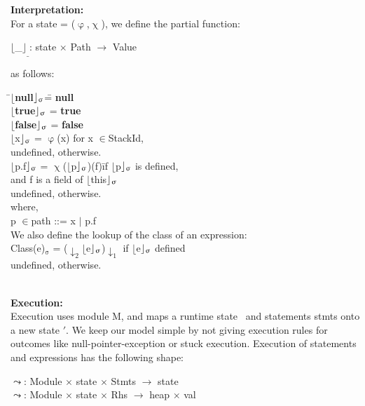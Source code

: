 \documentclass[a4paper,11pt,twoside]{article}
\newenvironment{logic}
{\begin{minipage}[c]{\linewidth}  \sffamily \mdseries \begin{tabbing}}
{\end{tabbing}\end{minipage}\vspace{0.3em}}
\newcommand{\loin}{$\in$}
\newcommand{\losigma}{\text{$\upsigma$}}
\newcommand{\lochi}{$\upchi$}
\newcommand{\lophi}{$\upvarphi$}
\newcommand{\loleadsto} {$\leadsto$}
\newcommand{\loexec}[2] {$\lfloor$#1$\rfloor _{\text{#2}}$}
\begin{document}
\textbf{Interpretation:}\\
For a state \losigma = (\lophi,\lochi), we define the partial function:\\

\begin{logic}
\quad \loexec{\_}{\_}: state $\times$ Path $\rightarrow$ Value\\
\end{logic}

as follows:\\
\begin{logic}
\quad\=\loexec{\textbf{null}}{\losigma}\quad \= = \textbf{null}\\
\>\loexec{\textbf{true}}{\losigma} \>= \textbf{true}\\
\>\loexec{\textbf{false}}{\losigma} \>= \textbf{false}\\
\>\loexec{x}{\losigma} \>= \lophi(x) for x \loin StackId,\\
\>\>undefined, otherwise.\\
\> \loexec{p.f}{\losigma} \>= \lochi(\loexec{p}{\losigma})(f)\quad  \=if \loexec{p}{\losigma} is defined,\\
\>\>\>and f is a field of \loexec{this}{\losigma}\\
\>\>undefined, otherwise.\\
where,\\
\> p \loin path \>::= x $|$ p.f\\
We also define the lookup of the class of an
expression:\\
\> Class(e)$_\losigma$ \> = (\losigma$\downarrow_2$\loexec{e}{\losigma})$\downarrow_1$ if \loexec{e}{\losigma} defined\\
\>\>undefined, otherwise.\\
\end{logic}\\

\textbf{Execution:}\\
Execution uses module M, and maps a runtime state \losigma\ and statements stmts onto a new state \losigma$'$. We keep our model simple by not giving execution rules for outcomes like null-pointer-exception or stuck execution. Execution of statements and expressions has the following shape:\\

\begin{logic}
\quad \loleadsto \quad : Module $\times$ state $\times$ Stmts $\rightarrow$ state\\
\quad \loleadsto \quad : Module $\times$ state $\times$ Rhs $\rightarrow$ heap $\times$ val\\
\end{logic}
\end{document}
